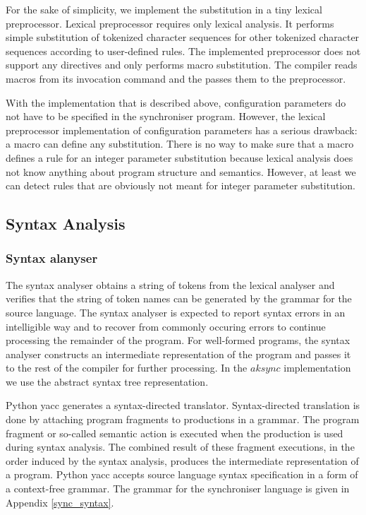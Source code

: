 For the sake of simplicity, we implement the substitution in a tiny lexical preprocessor. Lexical preprocessor requires only lexical analysis. It performs simple substitution of tokenized character sequences for other tokenized character sequences according to user-defined rules. The implemented preprocessor does not support any directives and only performs macro substitution. The compiler reads macros from its invocation command and the passes them to the preprocessor.

With the implementation that is described above, configuration parameters do not have to be specified in the synchroniser program. However, the lexical preprocessor implementation of configuration parameters has a serious drawback: a macro can define any substitution. There is no way to make sure that a macro defines a rule for an integer parameter substitution because lexical analysis does not know anything about program structure and semantics. However, at least we can detect rules that are obviously not meant for integer parameter substitution.



\subsection{Syntax Analysis}
  \subsubsection{Syntax alanyser}
The syntax analyser obtains a string of tokens from the lexical analyser and verifies that the string of token names can be generated by the grammar for the source language. The syntax analyser is expected to report syntax errors in an intelligible way and to recover from commonly occuring errors to continue processing the remainder of the program. For well-formed programs, the syntax analyser constructs an intermediate representation of the program and passes it to the rest of the compiler for further processing. In the $aksync$ implementation we use the abstract syntax tree representation.

Python yacc generates a syntax-directed translator. Syntax-directed translation is done by attaching program fragments to productions in a grammar. The program fragment or so-called semantic action is executed when the production is used during syntax analysis. The combined result of these fragment executions, in the order induced by the syntax analysis, produces the intermediate representation of a program. Python yacc accepts source language syntax specification in a form of a context-free grammar. The grammar for the synchroniser language is given in Appendix \ref{sync_syntax}.

